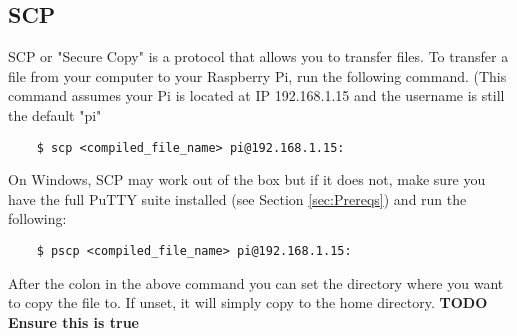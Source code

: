 \subsection{SCP}
\label{sec:SCP}
SCP or "Secure Copy" is a protocol that allows you to transfer files. \newline
To transfer a file from your computer to your Raspberry Pi, run the following command. (This command assumes your Pi is located at IP 192.168.1.15 and the username is still the default "pi"
\begin{verbatim}
    $ scp <compiled_file_name> pi@192.168.1.15:
\end{verbatim}
On Windows, SCP may work out of the box but if it does not, make sure you have the full PuTTY suite installed (see Section \ref{sec:Prereqs}) and run the following:
\begin{verbatim}
    $ pscp <compiled_file_name> pi@192.168.1.15:
\end{verbatim}
After the colon in the above command you can set the directory where you want to copy the file to. If unset, it will simply copy to the home directory. \textbf{TODO Ensure this is true}